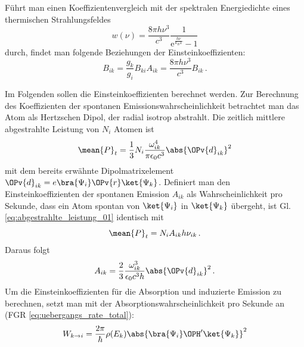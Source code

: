 Führt man einen Koeffizientenvergleich mit der spektralen
Energiedichte eines thermischen Strahlungsfeldes \cite{demtroeder:ex3}
\begin{equation}\label{eq:spektrale_energiedichte_2}
	w(\nu)=\frac{8\pi h\nu^3}{c^3}\frac{1}{\mathrm{e}^\frac{h\nu}{k_BT}-1}
\end{equation}
durch, findet man folgende Beziehungen der Einsteinkoeffizienten:
\begin{subequations}\label{eq:einsteinkoeff_relationen}
	\begin{equation}\label{eq:einsteinkoeff_relationen_1}
		B_{ik}=\frac{g_k}{g_i}B_{ki}
	\end{equation}
	\begin{equation}\label{eq:einsteinkoeff_relationen_2}
		A_{ik}=\frac{8\pi h\nu^3}{c^3}B_{ik}\,.
	\end{equation}
\end{subequations}
\par
Im Folgenden sollen die Einsteinkoeffizienten berechnet werden.
Zur Berechnung des Koeffizienten der spontanen Emissionswahrscheinlichkeit
betrachtet man das Atom als Hertzschen Dipol, der radial isotrop abstrahlt. Die
zeitlich mittlere abgestrahlte Leistung von $N_i$ Atomen
\cite{demtroeder:ex3} ist
\begin{equation}\label{eq:abgestrahlte_leistung_01}
	\mean{P}_t = \frac{1}{3}N_i\frac{\omega_{ik}^4}{\pi\epsilon_0
	c^3}\abs{\OPv{d}_{ik}}^2
\end{equation}
mit dem bereits erwähnte Dipolmatrixelement
$\OPv{d}_{ik}=e\bra{\Psi_i}\OPv{r}\ket{\Psi_k}$. Definiert man den
Einsteinkoeffizienten der spontanen Emission $A_{ik}$ als Wahrscheinlichkeit pro
Sekunde, dass ein Atom spontan von $\ket{\Psi_i}$ in $\ket{\Psi_k}$ übergeht,
ist Gl. \eqref{eq:abgestrahlte_leistung_01} identisch mit
\begin{equation}\label{eq:abgestrahlte_leistung_02}
	\mean{P}_t=N_iA_{ik}h\nu_{ik}\,.
\end{equation}
Daraus folgt
\begin{equation}\label{eq:einstein_koeff_A}
	A_{ik}=\frac{2}{3}\frac{\omega_{ik}^3}{\epsilon_0c^3h}\abs{\OPv{d}_{ik}}^2\,.
\end{equation}
Um die Einsteinkoeffizienten für die Absorption und induzierte Emission
zu berechnen, setzt man mit der Absorptionswahrscheinlichkeit pro Sekunde an
(FGR \eqref{eq:uebergangs_rate_total}):
\begin{equation}\label{eq:w_ki_01}
	W_{k\to i}
	= \frac{2\pi}{\hbar}\rho(E_k)\abs{\bra{\Psi_i}\OPH'\ket{\Psi_k}}^2
\end{equation}
